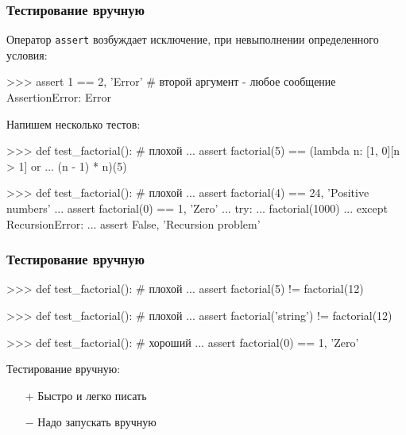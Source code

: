 \documentclass[fleqn, xcolor=x11names]{beamer}
\begin{document}
\begin{frame}[fragile]\frametitle{Тестирование вручную}

Оператор \texttt{assert} возбуждает исключение, при невыполнении
определенного условия:
\begin{pcode}
>>> assert 1 == 2, 'Error' # второй аргумент - любое сообщение
AssertionError: Error
\end{pcode}

\hfill

Напишем несколько тестов:

\begin{pcode}
>>> def test_factorial(): # плохой
...    assert factorial(5) == (lambda n: [1, 0][n > 1] or
...                            (n - 1) * n)(5)
\end{pcode}

\begin{pcode}
>>> def test_factorial(): # плохой
...    assert factorial(4) == 24, 'Positive numbers'
...    assert factorial(0) == 1, 'Zero'
...    try:
...        factorial(1000)
...    except RecursionError:
...        assert False, 'Recursion problem'
\end{pcode}

\end{frame}

\begin{frame}[fragile]\frametitle{Тестирование вручную}
\begin{pcode}
>>> def test_factorial(): # плохой
...    assert factorial(5) != factorial(12)
\end{pcode}

\hfill

\begin{pcode}
>>> def test_factorial(): # плохой
...    assert factorial('string') != factorial(12)
\end{pcode}

\hfill

\begin{pcode}
>>> def test_factorial(): # хороший
...    assert factorial(0) == 1, 'Zero'
\end{pcode}

\hfill

Тестирование вручную:
\begin{itemize}
\item[+] Быстро и легко писать
\item[$-$] Надо запускать вручную
\end{itemize}

\end{frame}
\end{document}
